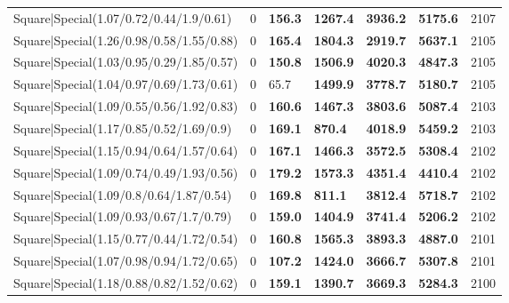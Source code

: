 \begin{tabular}{lrllllr}
 Square|Special(1.07/0.72/0.44/1.9/0.61)                       &             0   & \textbf{156.3} & \textbf{1267.4} & \textbf{3936.2} & \textbf{5175.6} &         2107 \\
 Square|Special(1.26/0.98/0.58/1.55/0.88)                      &             0   & \textbf{165.4} & \textbf{1804.3} & \textbf{2919.7} & \textbf{5637.1} &         2105 \\
 Square|Special(1.03/0.95/0.29/1.85/0.57)                      &             0   & \textbf{150.8} & \textbf{1506.9} & \textbf{4020.3} & \textbf{4847.3} &         2105 \\
 Square|Special(1.04/0.97/0.69/1.73/0.61)                      &             0   & 65.7           & \textbf{1499.9} & \textbf{3778.7} & \textbf{5180.7} &         2105 \\
 Square|Special(1.09/0.55/0.56/1.92/0.83)                      &             0   & \textbf{160.6} & \textbf{1467.3} & \textbf{3803.6} & \textbf{5087.4} &         2103 \\
 Square|Special(1.17/0.85/0.52/1.69/0.9)                       &             0   & \textbf{169.1} & \textbf{870.4}  & \textbf{4018.9} & \textbf{5459.2} &         2103 \\
 Square|Special(1.15/0.94/0.64/1.57/0.64)                      &             0   & \textbf{167.1} & \textbf{1466.3} & \textbf{3572.5} & \textbf{5308.4} &         2102 \\
 Square|Special(1.09/0.74/0.49/1.93/0.56)                      &             0   & \textbf{179.2} & \textbf{1573.3} & \textbf{4351.4} & \textbf{4410.4} &         2102 \\
 Square|Special(1.09/0.8/0.64/1.87/0.54)                       &             0   & \textbf{169.8} & \textbf{811.1}  & \textbf{3812.4} & \textbf{5718.7} &         2102 \\
 Square|Special(1.09/0.93/0.67/1.7/0.79)                       &             0   & \textbf{159.0} & \textbf{1404.9} & \textbf{3741.4} & \textbf{5206.2} &         2102 \\
 Square|Special(1.15/0.77/0.44/1.72/0.54)                      &             0   & \textbf{160.8} & \textbf{1565.3} & \textbf{3893.3} & \textbf{4887.0} &         2101 \\
 Square|Special(1.07/0.98/0.94/1.72/0.65)                      &             0   & \textbf{107.2} & \textbf{1424.0} & \textbf{3666.7} & \textbf{5307.8} &         2101 \\
 Square|Special(1.18/0.88/0.82/1.52/0.62)                      &             0   & \textbf{159.1} & \textbf{1390.7} & \textbf{3669.3} & \textbf{5284.3} &         2100 \\

\end{tabular}
